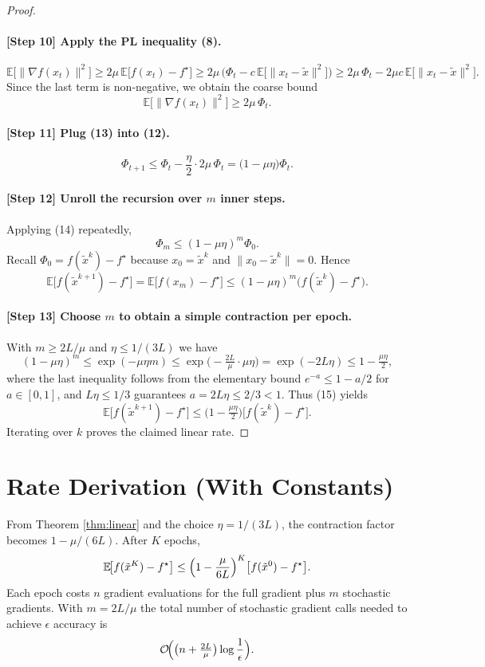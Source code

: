 \documentclass{article}
\begin{document}
\begin{proof}
\paragraph{[Step 10] Apply the PL inequality (8).}
\[
\mathbb{E}\!\big[\|\nabla f(x_{t})\|^{2}\big]\ge 2\mu\,\mathbb{E}\!\big[f(x_{t})-f^{\star}\big]
\ge 2\mu\,\big(\Phi_{t}-c\,\mathbb{E}\!\big[\|x_{t}-\tilde{x}\|^{2}\big]\big)
\ge 2\mu\,\Phi_{t} - 2\mu c\,\mathbb{E}\!\big[\|x_{t}-\tilde{x}\|^{2}\big].
\]
Since the last term is non‑negative, we obtain the coarse bound
\[
\mathbb{E}\!\big[\|\nabla f(x_{t})\|^{2}\big]\ge 2\mu\,\Phi_{t}. \tag{13}
\]

\paragraph{[Step 11] Plug (13) into (12).}
\[
\Phi_{t+1}\le \Phi_{t}-\frac{\eta}{2}\cdot 2\mu\,\Phi_{t}
= \big(1-\mu\eta\big)\Phi_{t}. \tag{14}
\]

\paragraph{[Step 12] Unroll the recursion over $m$ inner steps.}
Applying (14) repeatedly,
\[
\Phi_{m}\le (1-\mu\eta)^{m}\Phi_{0}.
\]
Recall $\Phi_{0}=f(\tilde{x}^{k})-f^{\star}$ because $x_{0}=\tilde{x}^{k}$ and $\|x_{0}-\tilde{x}^{k}\|=0$.
Hence
\[
\mathbb{E}\!\big[f(\tilde{x}^{k+1})-f^{\star}\big]=\mathbb{E}\!\big[f(x_{m})-f^{\star}\big]\le (1-\mu\eta)^{m}\big(f(\tilde{x}^{k})-f^{\star}\big). \tag{15}
\]

\paragraph{[Step 13] Choose $m$ to obtain a simple contraction per epoch.}
With $m\ge 2L/\mu$ and $\eta\le 1/(3L)$ we have
\[
(1-\mu\eta)^{m}\le \exp(-\mu\eta m)\le \exp\!\big(-\tfrac{2L}{\mu}\cdot\mu\eta\big)
= \exp(-2L\eta)\le 1-\tfrac{\mu\eta}{2},
\]
where the last inequality follows from the elementary bound $e^{-a}\le 1-a/2$ for $a\in[0,1]$,
and $L\eta\le 1/3$ guarantees $a=2L\eta\le 2/3<1$.
Thus (15) yields
\[
\mathbb{E}\!\big[f(\tilde{x}^{k+1})-f^{\star}\big]
\le\bigl(1-\tfrac{\mu\eta}{2}\bigr)\bigl[f(\tilde{x}^{k})-f^{\star}\bigr].
\]
Iterating over $k$ proves the claimed linear rate. \qedhere
\end{proof}

\section*{Rate Derivation (With Constants)}
From Theorem \ref{thm:linear} and the choice $\eta=1/(3L)$,
the contraction factor becomes $1-\mu/(6L)$. After $K$ epochs,
\[
\mathbb{E}\!\big[f(\tilde{x}^{K})-f^{\star}\big]
\le \Bigl(1-\frac{\mu}{6L}\Bigr)^{K}\bigl[f(\tilde{x}^{0})-f^{\star}\bigr].
\]
Each epoch costs $n$ gradient evaluations for the full gradient plus $m$ stochastic
gradients. With $m=2L/\mu$ the total number of stochastic gradient calls needed to achieve
$\epsilon$ accuracy is
\[
\mathcal{O}\!\Bigl(\bigl(n+\tfrac{2L}{\mu}\bigr)\log\frac{1}{\epsilon}\Bigr).
\]
\end{document}
